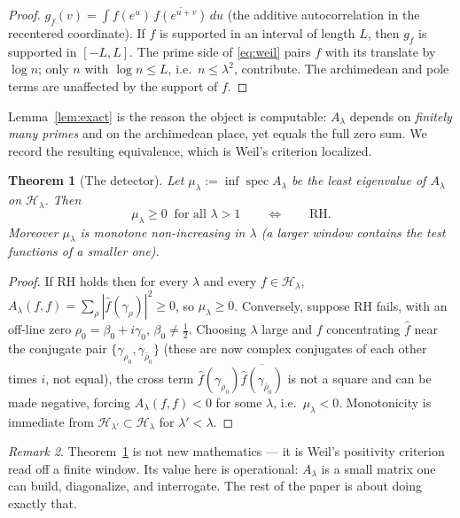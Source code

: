 \documentclass[11pt]{amsart}
\newtheorem{theorem}{Theorem}[section]
\theoremstyle{definition}
\theoremstyle{remark}
\newtheorem{remark}[theorem]{Remark}
\newcommand{\lam}{\lambda}
\begin{document}
\begin{proof}
$g_f(v)=\int f(e^{u})\,\overline{f(e^{u+v})}\,du$ (the additive autocorrelation in the recentered coordinate). If $f$ is supported in an interval of length $L$, then $g_f$ is supported in $[-L,L]$. The prime side of \eqref{eq:weil} pairs $f$ with its translate by $\log n$; only $n$ with $\log n\le L$, i.e.\ $n\le\lam^2$, contribute. The archimedean and pole terms are unaffected by the support of $f$.
\end{proof}

Lemma~\ref{lem:exact} is the reason the object is computable: $A_\lam$ depends on \emph{finitely many primes} and on the archimedean place, yet equals the full zero sum. We record the resulting equivalence, which is Weil's criterion localized.

\begin{theorem}[The detector]\label{thm:detector}
Let $\mu_\lam:=\inf\operatorname{spec} A_\lam$ be the least eigenvalue of $A_\lam$ on $\mathcal H_\lam$. Then
\[
\mu_\lam\ge 0\ \text{ for all } \lam>1\qquad\Longleftrightarrow\qquad \text{RH}.
\]
Moreover $\mu_\lam$ is monotone non-increasing in $\lam$ (a larger window contains the test functions of a smaller one).
\end{theorem}

\begin{proof}
If RH holds then for every $\lam$ and every $f\in\mathcal H_\lam$, $A_\lam(f,f)=\sum_\rho|\widehat f(\gamma_\rho)|^2\ge0$, so $\mu_\lam\ge0$. Conversely, suppose RH fails, with an off-line zero $\rho_0=\beta_0+i\gamma_0$, $\beta_0\neq\tfrac12$. Choosing $\lam$ large and $f$ concentrating $\widehat f$ near the conjugate pair $\{\gamma_{\rho_0},\gamma_{\bar\rho_0}\}$ (these are now complex conjugates of each other times $i$, not equal), the cross term $\widehat f(\gamma_{\rho_0})\overline{\widehat f(\gamma_{\bar\rho_0})}$ is not a square and can be made negative, forcing $A_\lam(f,f)<0$ for some $\lam$, i.e.\ $\mu_\lam<0$. Monotonicity is immediate from $\mathcal H_{\lam'}\subset\mathcal H_\lam$ for $\lam'<\lam$.
\end{proof}

\begin{remark}
Theorem~\ref{thm:detector} is not new mathematics --- it is Weil's positivity criterion read off a finite window. Its value here is operational: $A_\lam$ is a small matrix one can build, diagonalize, and interrogate. The rest of the paper is about doing exactly that.
\end{remark}
\end{document}
